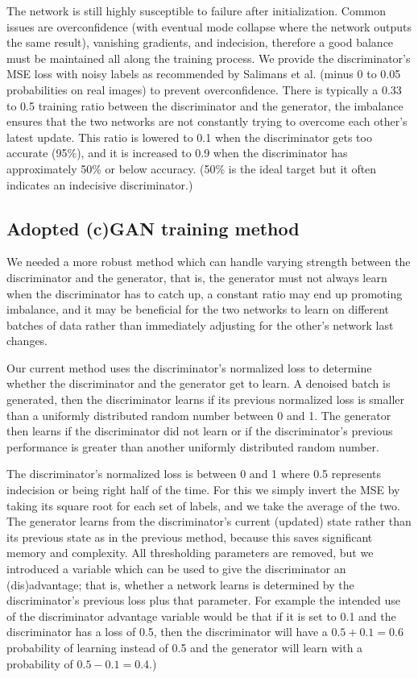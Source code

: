 The network is still highly susceptible to failure after initialization. Common issues are overconfidence (with eventual mode collapse where the network outputs the same result), vanishing gradients, and indecision, therefore a good balance must be maintained all along the training process. We provide the discriminator's \ac{MSE} loss with noisy labels as recommended by Salimans et al. \cite{gantechniques}\cite{gantutorial} (minus 0 to 0.05 probabilities on real images) to prevent overconfidence. There is typically a 0.33 to 0.5 training ratio between the discriminator and the generator, the imbalance ensures that the two networks are not constantly trying to overcome each other's latest update. This ratio is lowered to 0.1 when the discriminator gets too accurate (95\%), and it is increased to 0.9 when the discriminator has approximately 50\% or below accuracy. (50\% is the ideal target but it often indicates an indecisive discriminator.)

\subsection{Adopted (c)GAN training method}\label{sec:Adopted training method}

We needed a more robust method which can handle varying strength between the discriminator and the generator, that is, the generator must not always learn when the discriminator has to catch up, a constant ratio may end up promoting imbalance, and it may be beneficial for the two networks to learn on different batches of data rather than immediately adjusting for the other's network last changes.

Our current method uses the discriminator's normalized loss to determine whether the discriminator and the generator get to learn. A denoised batch is generated, then the discriminator learns if its previous normalized loss is smaller than a uniformly distributed random number between 0 and 1. The generator then learns if the discriminator did not learn or if the discriminator's previous performance is greater than another uniformly distributed random number.

The discriminator's normalized loss is between 0 and 1 where 0.5 represents indecision or being right half of the time. For this we simply invert the \ac{MSE} by taking its square root for each set of labels, and we take the average of the two. The generator learns from the discriminator's current (updated) state rather than its previous state as in the previous method, because this saves significant memory and complexity. All thresholding parameters are removed, but we introduced a variable which can be used to give the discriminator an (dis)advantage; that is, whether a network learns is determined by the discriminator's previous loss plus that parameter. For example the intended use of the discriminator advantage variable would be that if it is set to 0.1 and the discriminator has a loss of 0.5, then the discriminator will have a $0.5+0.1=0.6$ probability of learning instead of 0.5 and the generator will learn with a probability of $0.5-0.1=0.4$.)



